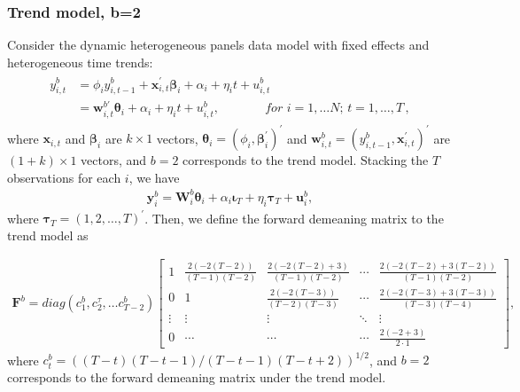 \documentclass[12pt,a4paper,hyperref]{article}
\begin{document}
\subsubsection{Trend model, b=2}
Consider the dynamic heterogeneous panels data model with fixed effects and heterogeneous time trends:
\begin{align}
\begin{split}
y^{b}_{i,t}&= \phi_{i} y^{b}_{i,t-1}+ \boldsymbol{x}^{'}_{i,t}\boldsymbol{\beta}_{i}+\alpha_{i}+\eta_{i}t+u^{b}_{i,t} \\
&= \boldsymbol{w}^{b'}_{i,t}\boldsymbol{\theta}_{i}+ \alpha_{i}+\eta_{i}t+u^{b}_{i,t}, \,\,\,\, \,\, \,\, \,\,\,\, \,\,\,\, \,\,\,\, \,\, for\,\,i=1,\ldots N;\,t=1,\ldots,T\, ,
\end{split}
\end{align}
where $\boldsymbol{x}_{i,t}$ and $\boldsymbol{\beta}_{i}$ are $k \times 1$ vectors,  $\boldsymbol{\theta}_{i}=\left(\phi_{i}, \boldsymbol{\beta}^{'}_{i} \right)^{'}$ and $\boldsymbol{w}^{b}_{i,t}=\left(y^{b}_{i,t-1}, \boldsymbol{x}^{'}_{i,t} \right)^{'}$ are $\left(1+k\right) \times 1$ vectors, and $b=2$ corresponds to the trend model.
Stacking the $T$ observations for each $i$, we have
\begin{align}
\boldsymbol{y}^{b}_{i}=\boldsymbol{W}^{b}_{i}\boldsymbol{\theta}_{i}+ \alpha_{i}\boldsymbol{\iota}_{T}+\eta_{i}\boldsymbol{\tau}_{T} + \boldsymbol{u}^{b}_{i}, \label{6}
\end{align}
where $\boldsymbol{\tau}_{T}=\left(1, 2, \ldots, T \right)^{'}$. Then, we define the forward demeaning matrix to the trend model as

\begin{align}
\boldsymbol{F}^{b}=diag(c^{b}_{1}, c^{\tau}_{2}, \ldots c^{b}_{T-2})
\begin{bmatrix}
1 & \frac{2(-2(T-2))}{(T-1)(T-2)} & \frac{2(-2(T-2)+3)}{(T-1)(T-2)} & \cdots & \frac{2(-2(T-2)+3(T-2))}{(T-1)(T-2)} \\
0 & 1 & \frac{2(-2(T-3))}{(T-2)(T-3)} & \cdots & \frac{2(-2(T-3)+3(T-3))}{(T-3)(T-4)} \\
\vdots &\vdots & \vdots & \ddots  &\vdots \\
0 & \cdots & \cdots & \cdots & \frac{2(-2+3)}{2 \cdot 1}
\end{bmatrix}, \label {7}
\end{align}
where $c^{b}_{t}=\left((T-t)(T-t-1)/(T-t-1)(T-t+2)\right)^{1/2}$, and $b=2$ corresponds to the forward demeaning matrix under the trend model.
\end{document}
